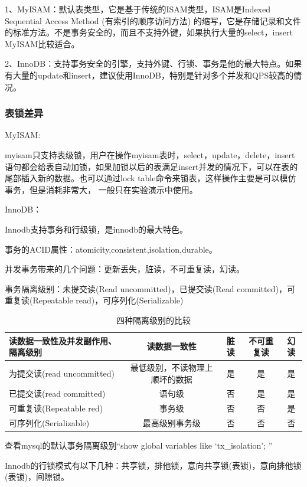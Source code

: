 \documentclass[UTF8]{ctexart}
\begin{document}
1、MyISAM：默认表类型，它是基于传统的ISAM类型，ISAM是Indexed Sequential Access Method (有索引的顺序访问方法) 的缩写，它是存储记录和文件的标准方法。不是事务安全的，而且不支持外键，如果执行大量的select，insert MyISAM比较适合。

2、InnoDB：支持事务安全的引擎，支持外键、行锁、事务是他的最大特点。如果有大量的update和insert，建议使用InnoDB，特别是针对多个并发和QPS较高的情况。

\subsubsection{表锁差异}
MyISAM:

myisam只支持表级锁，用户在操作myisam表时，select，update，delete，insert语句都会给表自动加锁，如果加锁以后的表满足insert并发的情况下，可以在表的尾部插入新的数据。也可以通过lock table命令来锁表，这样操作主要是可以模仿事务，但是消耗非常大，
一般只在实验演示中使用。

InnoDB：

Innodb支持事务和行级锁，是innodb的最大特色。

事务的ACID属性：atomicity,consistent,isolation,durable。

并发事务带来的几个问题：更新丢失，脏读，不可重复读，幻读。

事务隔离级别：未提交读(Read uncommitted)，已提交读(Read committed)，可重复读(Repeatable read)，可序列化(Serializable)

\begin{table}[]
    \caption{四种隔离级别的比较}
    \vspace{20pt}
    \centering
    \begin{tabular}{|l|c|c|c|c|}
        \hline
        读数据一致性及并发副作用、隔离级别&读数据一致性&脏读&不可重复读&幻读\\
        \hline
		为提交读(read uncommitted)&最低级别，不读物理上顺坏的数据&是&是&是\\
		已提交读(read committed)	&语句级&否&是&是\\
		可重复读(Repeatable red)	&事务级&否&否&是\\
		可序列化(Serializable)	&最高级别事务级&否&否&否\\
        \hline       
    \end{tabular}
    \label{bs02}
\end{table}

查看mysql的默认事务隔离级别“show global variables like ‘tx\_isolation’; ”

Innodb的行锁模式有以下几种：共享锁，排他锁，意向共享锁(表锁)，意向排他锁(表锁)，间隙锁。
\end{document}
